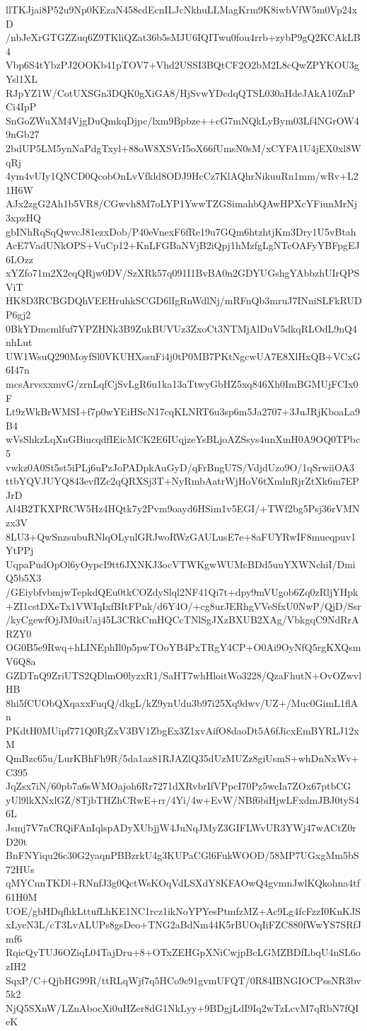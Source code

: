 llTKJjai8P52u9Np0KEzaN458cdEcnILJcNkhuLLMagKrm9K8iwbVfW5m0Vp24xD
/nbJeXrGTGZZuq6Z9TKliQZat36b5sMJU6IQITwu0fou4rrb+zybP9gQ2KCAkLB4
Vbp6S4tYbzPJ2OOKb41pTOV7+Vhd2USSI3BQtCF2O2bM2L8cQwZPYKOU3gYsl1XL
RJpYZ1W/CotUXSGn3DQK0gXiGA8/HjSvwYDcdqQTSL030aHdeJAkA10ZnPCi4IpP
SnGoZWuXM4VjgDuQmkqDjpc/lxm9Bpbze++cG7mNQkLyBym03Lf4NGrOW49nGb27
2bdUP5LM5ynNaPdgTxyl+88oW8XSVrI5oX66fUmsN0sM/xCYFA1U4jEX0xl8WqRj
4ym4vUIy1QNCD0QcobOnLvVfkld8ODJ9HcCz7KlAQhrNikuuRn1mm/wRv+L21H6W
AJx2zgG2Ah1b5VR8/CGwvh8M7oLYP1YwwTZGSimahbQAwHPXcYFiunMrNj3xpzHQ
gbINhRqSqQwvcJ81ezxDob/P40eVnexF6fRe19u7GQm6htzhtjKm3Dry1U5vBtah
AcE7VadUNkOPS+VuCp12+KnLFGBaNVjB2iQpj1hMzfgLgNTcOAFyYBFpgEJ6LOzz
xYZfo71m2X2cqQRjw0DV/SzXRk57q091I1BvBA0n2GDYUGshgYAbbzhUIrQPSViT
HK8D3RCBGDQhVEEHruhkSCGD6lIgRnWdlNj/mRFnQb3mruJ7INniSLFkRUDP6gj2
0BkYDmcmlfuf7YPZHNk3B9ZukBUVUz3ZxoCt3NTMjAlDuV5dkqRLOdL9nQ4nhLut
UW1WsuQ290MoyfSl0VKUHXssuFi4j0tP0MB7PKtNgcwUA7E8XlHxQB+VCxG6I47n
mcsArvsxxmvG/zrnLqfCjSvLgR6u1ka13aTtwyGbHZ5xq846Xh0ImBGMUjFCIx0F
Lt9zWkBrWMSI+f7p0wYEiHScN17cqKLNRT6u3sp6m5Ja2707+3JuJRjKboaLa9B4
wVsShkzLqXnGBiucqdfIEicMCK2E6IUqjzeYsBLjoAZSsys4unXmH0A9OQ0TPbc5
vwkz0A0St5st5iPLj6uPzJoPADpkAuGyD/qFrBngU7S/VdjdUzo9O/1qSrwiiOA3
ttbYQVJUYQ843evfIZc2qQRXSj3T+NyRmbAatrWjHoV6tXmlnRjrZtXk6m7EPJrD
Al4B2TKXPRCW5Hz4HQtk7y2Pvm9oayd6HSim1v5EGI/+TWf2bg5Psj36rVMNzx3V
8LU3+QwSnzsubuRNlqOLynlGRJwoRWzGAULusE7e+8aFUYRwIF8mueqpuv1YtPPj
UqpaPudOpOl6yOypcI9tt6JXNKJ3ocVTWKgwWUMcBDd5uuYXWNchiI/DmiQ5b5X3
/GEiybfvbmjwTepkdQEu0tkCOZdySlql2NF41Qi7t+dpy9mVUgob6Zq0zRljYHpk
+ZI1cstDXeTx1VWIqIxfBItFPnk/d6Y4O/+cg8urJERhgVVeSfxU0NwP/QjD/Ssr
/kyCgewfOjJM0aiUaj45L3CRkCmHQCcTNlSgJXzBXUB2XAg/VbkgqC9NdRrARZY0
OG0B5e9Rwq+hLINEphIl0p5pwTOoYB4PxTRgY4CP+O0Ai9OyNfQ5rgKXQsmV6Q8a
GZDTnQ9ZriUTS2QDlmO0lyzxR1/SaHT7whHloitWo3228/QzaFhutN+OvOZwvlHB
8hi5fCUObQXqaxxFuqQ/dkgL/kZ9ynUdu3b97i25Xq9dwv/UZ+/Muc0GimL1flAn
PKdtH0MUipf771Q0RjZxV3BV1ZbgEx3Z1xvAifO8daoDt5A6fJicxEmBYRLJ12xM
QmBzc65u/LurKBhFh9R/5da1az81RJAZlQ35dUzMUZz8giUsmS+whDnNxWv+C395
JqZsx7iN/60pb7a6sWMOajoh6Rr7271dXRvbrIfVPpcI70Pz5wcIa7ZOx67ptbCG
yUl9lkXNxlGZ/8TjbTHZhCRwE+rr/4Yi/4w+EvW/NBf6biHjwLFxdmJBJ0tyS46L
Jsmj7V7nCRQiFAnIqlspADyXUbjjW4JuNqJMyZ3GIFLWvUR3YWj47wACtZ0rD20t
BnFNYiqu26c30G2yaqnPBBzrkU4g3KUPaCGl6FukWOOD/58MP7UGxgMm5bS72HUs
qMYCnnTKDl+RNnfJ3g0QctWsKOqVdLSXdY8KFAOwQ4gvmnJwlKQkohna4tf61H0M
UOE/gbHDqfhkLttufLhKE1NC1rcz1ikNoYPYesPtmfzMZ+Ac9Lg4fcFzzI0KnKJS
xLyeN3L/cT3LvALUPs8gsDeo+TNG2aBdNm44K5rBUOqIiFZC880fWwYS7SRfJmf6
RqicQyTUJ6OZiqL04TajDru+8+OTxZEHGpXNiCwjpBcLGMZBDfLbqU4nSL6ozIH2
SqxP/C+QjbHG99R/ttRLqWjf7q5HCo9c91gvmUFQT/0R84IBNGIOCPssNR3bv5k2
NjQ5SXnW/LZnAbocXi0uHZer8dG1NkLyy+9BDgjLdI9Iq2wTzLcvM7qRbN7fQIeK
